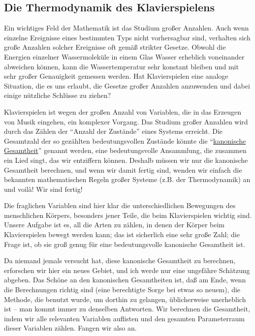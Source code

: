 
\subsection{Die Thermodynamik des Klavierspielens}
\label{c1iv3}

Ein wichtiges Feld der Mathematik ist das Studium großer Anzahlen.
Auch wenn einzelne Ereignisse eines bestimmten Typs nicht vorhersagbar sind, verhalten sich große Anzahlen solcher Ereignisse oft gemäß strikter Gesetze.
Obwohl die Energien einzelner Wassermoleküle in einem Glas Wasser erheblich voneinander abweichen können, kann die Wassertemperatur sehr konstant bleiben und mit sehr großer Genauigkeit gemessen werden.
Hat Klavierspielen eine analoge Situation, die es uns erlaubt, die Gesetze großer Anzahlen anzuwenden und dabei einige nützliche Schlüsse zu ziehen?


\label{canonic}

Klavierspielen ist wegen der großen Anzahl von Variablen, die in das Erzeugen von Musik eingehen, ein komplexer Vorgang.
Das Studium großer Anzahlen wird durch das Zählen der \enquote{Anzahl der Zustände} eines Systems erreicht.
Die Gesamtzahl der so gezählten bedeutungsvollen Zustände könnte die \enquote{\hyperref[ueb-canonic]{kanonische Gesamtheit}} genannt werden, eine bedeutungsvolle Ansammlung, die zusammen ein Lied singt, das wir entziffern können.
Deshalb müssen wir nur die kanonische Gesamtheit berechnen, und wenn wir damit fertig sind, wenden wir einfach die bekannten mathematischen Regeln großer Systeme (z.B. der Thermodynamik) an und voilà!
Wir sind fertig!

Die fraglichen Variablen sind hier klar die unterschiedlichen Bewegungen des menschlichen Körpers, besonders jener Teile, die beim Klavierspielen wichtig sind.
Unsere Aufgabe ist es, all die Arten zu zählen, in denen der Körper beim Klavierspielen bewegt werden kann; das ist sicherlich eine sehr große Zahl; die Frage ist, ob sie groß genug für eine bedeutungsvolle kanonische Gesamtheit ist.

Da niemand jemals versucht hat, diese kanonische Gesamtheit zu berechnen, erforschen wir hier ein neues Gebiet, und ich werde nur eine ungefähre Schätzung abgeben.
Das Schöne an den kanonischen Gesamtheiten ist, daß am Ende, wenn die Berechnungen richtig sind (eine berechtigte Sorge bei etwas so neuem), die Methode, die benutzt wurde, um dorthin zu gelangen, üblicherweise unerheblich ist -- man kommt immer zu denselben Antworten.
Wir berechnen die Gesamtheit, indem wir alle relevanten Variablen auflisten und den gesamten Parameterraum dieser Variablen zählen.
Fangen wir also an.

